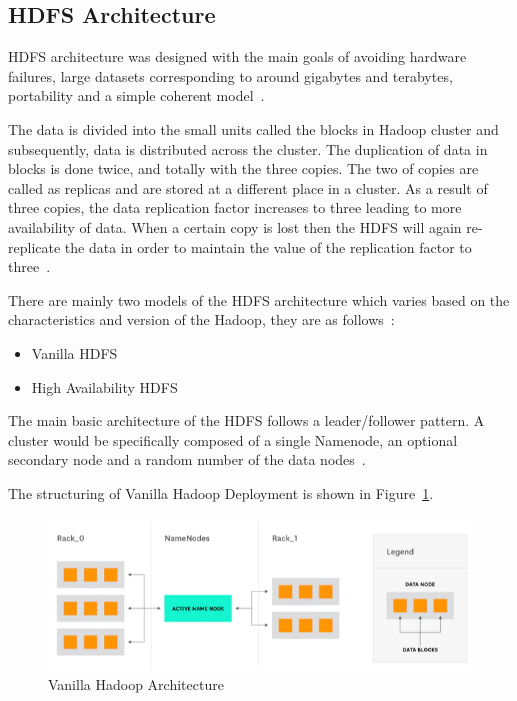 \subsection{HDFS Architecture}
HDFS architecture was designed with the main goals of avoiding 
hardware failures, large datasets corresponding to around gigabytes 
and terabytes, portability 
and a simple coherent model~\cite{hid-sp18-412-HDFS-Architecture}.

The data is divided into the small units called the blocks in Hadoop cluster and 
subsequently, data is distributed across the cluster. The duplication of data in 
blocks is done twice, and totally with the three copies. The two of copies are 
called as replicas and are stored at a different place in a cluster. As a result 
of three copies, the data replication factor increases to three leading to more 
availability of data. When a certain copy is lost then the HDFS will again 
re-replicate the data in order to maintain the value of the replication factor 
to three~\cite{hid-sp18-412-hadoop-architecture-overview}.

There are mainly two models of the HDFS architecture which varies based on the 
characteristics and version of the Hadoop, they are 
as follows~\cite{hid-sp18-412-hadoop-architecture-overview}:
\begin{itemize}
\item Vanilla HDFS
\item High Availability HDFS
\end{itemize}

The main basic architecture of the HDFS follows a leader/follower pattern. A 
cluster would be specifically composed of a single Namenode, an optional 
secondary node and a random number of the 
data nodes~\cite{hid-sp18-412-HDFS-Architecture}.

The structuring of Vanilla Hadoop Deployment is 
shown in Figure~\ref{s:vaniarchi}.

\begin{figure}[!ht]
\centering\includegraphics[width=\textwidth]{images/vanilla.png}
\caption{Vanilla 
Hadoop 
Architecture
~\cite{hid-sp18-412-hadoop-architecture-overview}}\label{s:vaniarchi}
\end{figure}

